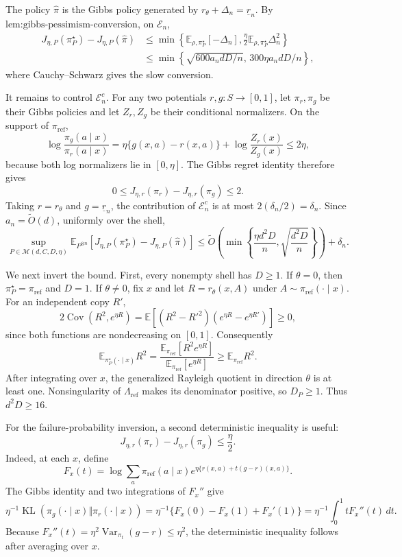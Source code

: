 The policy \(\widehat\pi\) is the Gibbs policy generated by \(r_\theta+\Delta_n=\underline r_n\). By \(\text{lem:gibbs-pessimism-conversion}\), on \(\mathcal E_n\),
\[
\begin{aligned}
J_{\eta,P}(\pi_P^\star)-J_{\eta,P}(\widehat\pi)
&\le\min\left\{\mathbb E_{\rho,\pi_P^\star}[-\Delta_n],\frac\eta2\mathbb E_{\rho,\pi_P^\star}\Delta_n^2\right\}\\
&\le\min\left\{\sqrt{600a_ndD/n},\,300\eta a_ndD/n\right\},
\end{aligned}
\]
where Cauchy--Schwarz gives the slow conversion.

It remains to control \(\mathcal E_n^c\). For any two potentials \(r,g:S\to[0,1]\), let \(\pi_r,\pi_g\) be their Gibbs policies and let \(Z_r,Z_g\) be their conditional normalizers. On the support of \(\pi_{\mathrm{ref}}\),
\[
\log\frac{\pi_g(a\mid x)}{\pi_r(a\mid x)}
=\eta\{g(x,a)-r(x,a)\}+\log\frac{Z_r(x)}{Z_g(x)}\le2\eta,
\]
because both log normalizers lie in \([0,\eta]\). The Gibbs regret identity therefore gives
\[
0\le J_{\eta,r}(\pi_r)-J_{\eta,r}(\pi_g)\le2.
\]
Taking \(r=r_\theta\) and \(g=\underline r_n\), the contribution of \(\mathcal E_n^c\) is at most \(2(\delta_n/2)=\delta_n\). Since \(a_n=\widetilde O(d)\), uniformly over the shell,
\[
\sup_{P\in\mathcal M(d,C,D,\eta)}\mathbb E_{P^{\otimes n}}[J_{\eta,P}(\pi_P^\star)-J_{\eta,P}(\widehat\pi)]
\le\widetilde O\left(\min\left\{\frac{\eta d^2D}{n},\sqrt{\frac{d^2D}{n}}\right\}\right)+\delta_n.
\]

We next invert the bound. First, every nonempty shell has \(D\ge1\). If \(\theta=0\), then \(\pi_P^\star=\pi_{\mathrm{ref}}\) and \(D=1\). If \(\theta\ne0\), fix \(x\) and let \(R=r_\theta(x,A)\) under \(A\sim\pi_{\mathrm{ref}}(\cdot\mid x)\). For an independent copy \(R'\),
\[
2\operatorname{Cov}(R^2,e^{\eta R})
=\mathbb E[(R^2-R'^2)(e^{\eta R}-e^{\eta R'})]\ge0,
\]
since both functions are nondecreasing on \([0,1]\). Consequently
\[
\mathbb E_{\pi_P^\star(\cdot\mid x)}R^2
=\frac{\mathbb E_{\pi_{\mathrm{ref}}}[R^2e^{\eta R}]}{\mathbb E_{\pi_{\mathrm{ref}}}[e^{\eta R}]}
\ge\mathbb E_{\pi_{\mathrm{ref}}}R^2.
\]
After integrating over \(x\), the generalized Rayleigh quotient in direction \(\theta\) is at least one. Nonsingularity of \(\Lambda_{\mathrm{ref}}\) makes its denominator positive, so \(D_P\ge1\). Thus \(d^2D\ge16\).

For the failure-probability inversion, a second deterministic inequality is useful:
\[
J_{\eta,r}(\pi_r)-J_{\eta,r}(\pi_g)\le\frac\eta2.
\]
Indeed, at each \(x\), define
\[
F_x(t)=\log\sum_a\pi_{\mathrm{ref}}(a\mid x)e^{\eta\{r(x,a)+t(g-r)(x,a)\}}.
\]
The Gibbs identity and two integrations of \(F_x''\) give
\[
\eta^{-1}\operatorname{KL}(\pi_g(\cdot\mid x)\Vert\pi_r(\cdot\mid x))
=\eta^{-1}\{F_x(0)-F_x(1)+F_x'(1)\}
=\eta^{-1}\int_0^1tF_x''(t)\,dt.
\]
Because \(F_x''(t)=\eta^2\operatorname{Var}_{\pi_t}(g-r)\le\eta^2\), the deterministic inequality follows after averaging over \(x\).

